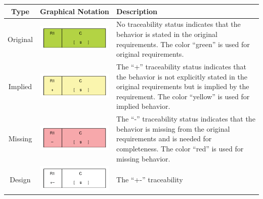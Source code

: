 \documentclass[]{article}
\begin{document}
\begin{tabularx}{\textwidth}{|c|c|X|}
\textbf{Type} & \textbf{Graphical Notation} & \textbf{Description}\\ \hline
Original &\includegraphics{figs/AppendixB/Tags/Original} & No traceability status indicates that the behavior is stated in the original requirements. The color ``green'' is used for original requirements.\\ \hline
Implied & \includegraphics{figs/AppendixB/Tags/Implied} & The ``+'' traceability status indicates that the behavior is not explicitly stated in the original requirements but is implied by the requirement. The color ``yellow'' is used for implied behavior.\\ \hline
Missing &\includegraphics{figs/AppendixB/Tags/Missing}  & The ``-'' traceability status indicates that the behavior is missing from the original requirements and is needed for completeness. The color ``red'' is used for missing behavior.\\ \hline
Design &\includegraphics{figs/AppendixB/Tags/Updated} & The ``+-'' traceability

\end{tabularx}
\end{document}
